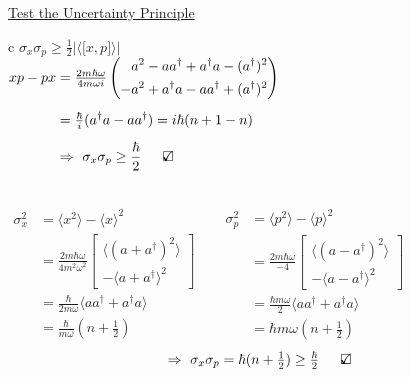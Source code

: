 \documentclass[12pt]{article}
\newcommand{\checkedbox}{\mbox{\ooalign{$\checkmark$\cr\hidewidth$\square$\hidewidth\cr}}} %
\begin{document}
\begin{minipage}[t]{.55\textwidth}
    \setlength{\parindent}{.5cm}
    \noindent
    \underline{Test the Uncertainty Principle}\\[10pt]
    { \setlength{\tabcolsep}{0pt}
    \begin{tabular}{c}
        \( \sigma_x \sigma_p \geq \frac{1}{2} 
            \Big| \Big\langle \big[ x,p \big] \Big\rangle \Big| \)\\[20pt]
        \( \begin{aligned} 
            xp-px &= \tfrac{2 m \hbar \omega}{4 m \omega i}
                \left( \begin{aligned}
                      a^2 - a a^\dagger + a^\dagger a - (a^\dagger)^2 \\
                    - a^2 + a^\dagger a - a a^\dagger + (a^\dagger)^2
                \end{aligned} \right) \\[5pt]
            &= \tfrac{\hbar}{i} (a^\dagger a - a a^\dagger) = i \hbar (n+1 - n)\\[5pt]
            &\Rightarrow \ \sigma_x \sigma_p \geq \frac{\hbar}{2} \indent \checkedbox
        \end{aligned} \)
    \end{tabular} }\\[15pt]
    \noindent
    \( \begin{aligned}
        \sigma_x^2 &= \langle x^2 \rangle 
            - \langle x \rangle^2 \\[5pt]
        &= \tfrac{ 2 m \hbar \omega }{4 m^2 \omega^2} 
            \left[ \begin{aligned}
                \langle (a + a^\dagger)^2 \rangle \\
                - \langle a + a^\dagger \rangle^2 
            \end{aligned} \right]\\[5pt]
        &= \tfrac{\hbar}{2 m \omega} \langle a a^\dagger + a^\dagger a \rangle \\[5pt]
        &= \tfrac{\hbar}{m \omega} (n + \tfrac{1}{2}) 
    \end{aligned} \) \ \ 
    \( \begin{aligned}
        \sigma_p^2 &= \langle p^2 \rangle 
            - \langle p \rangle^2 \\[5pt]
        &= \tfrac{ 2 m \hbar \omega }{-4} 
            \left[ \begin{aligned}
                \langle (a - a^\dagger)^2 \rangle \\
                - \langle a - a^\dagger \rangle^2 
            \end{aligned} \right]\\[5pt]
        &= \tfrac{\hbar m \omega}{2} \langle a a^\dagger + a^\dagger a \rangle \\[5pt]
        &= \hbar m \omega (n + \tfrac{1}{2}) 
    \end{aligned} \)\\[10pt]
    \[ \Rightarrow \ \sigma_x \sigma_p = \hbar (n+ \tfrac{1}{2}) \geq \tfrac{\hbar}{2} 
        \indent \checkedbox \]
\end{minipage}
\end{document}
